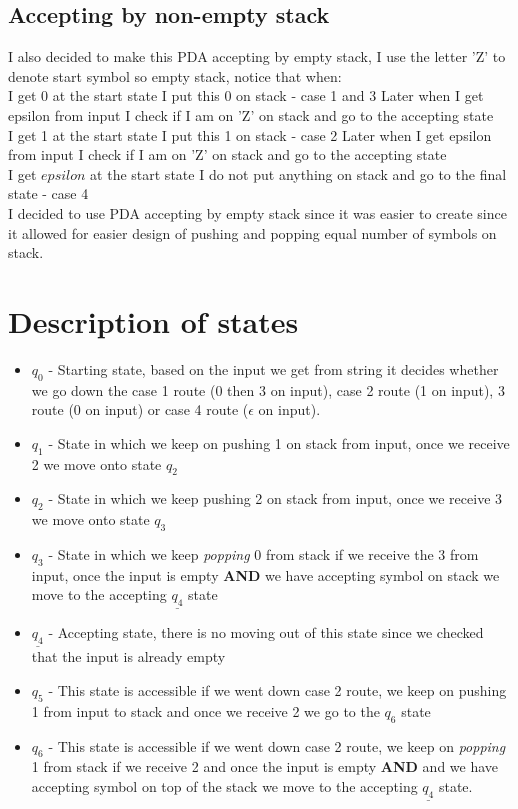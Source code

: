\documentclass{report}[pt12]
\begin{document}
\subsection{Accepting by non-empty stack}
I also decided to make this PDA accepting by empty stack, I use the letter 'Z' to denote start symbol so empty stack, notice that when: \\
I get 0 at the start state I put this 0 on stack - case 1 and 3
Later when I get epsilon from input I check if I am on 'Z' on stack and go to the accepting state \\
I get 1 at the start state I put this 1 on stack - case 2
Later when I get epsilon from input I check if I am on 'Z' on stack and go to the accepting state \\
I get $epsilon$ at the start state I do not put anything on stack and go to the final state - case 4 \\
I decided to use PDA accepting by empty stack since it was easier to create since it allowed for easier design of pushing and popping equal number of symbols on stack.

\section{Description of states}
\begin{itemize}
\item $q_0$ - Starting state, based on the input we get from string it decides whether we go down the case 1 route (0 then 3 on input), case 2 route (1 on input), 3 route (0 on input) or case 4 route ($\epsilon$ on input).
\item $q_1$ - State in which we keep on pushing 1 on stack from input, once we receive 2 we move onto state $q_2$
\item $q_2$ - State in which we keep pushing 2 on stack from input, once we receive 3 we move onto state $q_3$
\item $q_3$ - State in which we keep \emph{popping} 0 from stack if we receive the 3 from input, once the input is empty \textbf{AND} we have accepting symbol on stack we move to the accepting $\underline{q_4}$ state
\item $\underline{q_4}$ - Accepting state, there is no moving out of this state since we checked that the input is already empty
\item $q_5$ - This state is accessible if we went down case 2 route, we keep on pushing 1 from input to stack and once we receive 2 we go to the $q_6$ state
\item $q_6$ - This state is accessible if we went down case 2 route, we keep on \emph{popping} 1 from stack if we receive 2 and once the input is empty \textbf{AND} and we have accepting symbol on top of the stack we move to the accepting $\underline{q_4}$ state.
\end{itemize}
\end{document}
